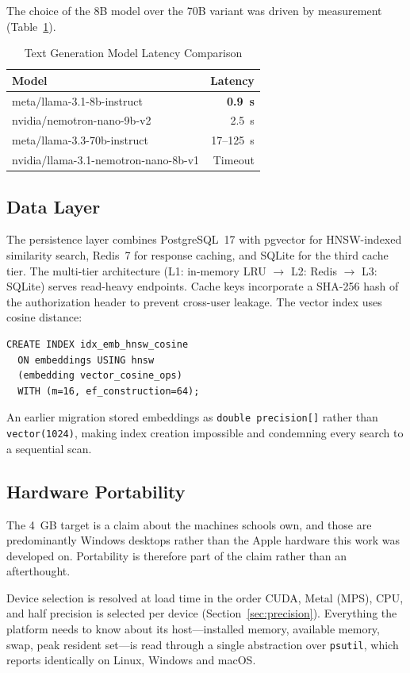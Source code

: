 \documentclass[conference]{IEEEtran}
\begin{document}
The choice of the 8B model over the 70B variant was driven by measurement (Table~\ref{tab:latency}).

\begin{table}[htbp]
\caption{Text Generation Model Latency Comparison}
\label{tab:latency}
\centering
\begin{tabular}{@{}lr@{}}
\toprule
\textbf{Model} & \textbf{Latency} \\
\midrule
meta/llama-3.1-8b-instruct & \textbf{0.9~s} \\
nvidia/nemotron-nano-9b-v2 & 2.5~s \\
meta/llama-3.3-70b-instruct & 17--125~s \\
nvidia/llama-3.1-nemotron-nano-8b-v1 & Timeout \\
\bottomrule
\end{tabular}
\end{table}

\subsection{Data Layer}
The persistence layer combines PostgreSQL~17 with pgvector for HNSW-indexed similarity search, Redis~7 for response caching, and SQLite for the third cache tier. The multi-tier architecture (L1: in-memory LRU $\to$ L2: Redis $\to$ L3: SQLite) serves read-heavy endpoints. Cache keys incorporate a SHA-256 hash of the authorization header to prevent cross-user leakage. The vector index uses cosine distance:
\begin{verbatim}
CREATE INDEX idx_emb_hnsw_cosine
  ON embeddings USING hnsw
  (embedding vector_cosine_ops)
  WITH (m=16, ef_construction=64);
\end{verbatim}

An earlier migration stored embeddings as \texttt{double precision[]} rather than \texttt{vector(1024)}, making index creation impossible and condemning every search to a sequential scan.

\subsection{Hardware Portability}
\label{sec:hardware}
The 4~GB target is a claim about the machines schools own, and those are predominantly Windows desktops rather than the Apple hardware this work was developed on. Portability is therefore part of the claim rather than an afterthought.

Device selection is resolved at load time in the order CUDA, Metal (MPS), CPU, and half precision is selected per device (Section~\ref{sec:precision}). Everything the platform needs to know about its host---installed memory, available memory, swap, peak resident set---is read through a single abstraction over \texttt{psutil}, which reports identically on Linux, Windows and macOS.
\end{document}
